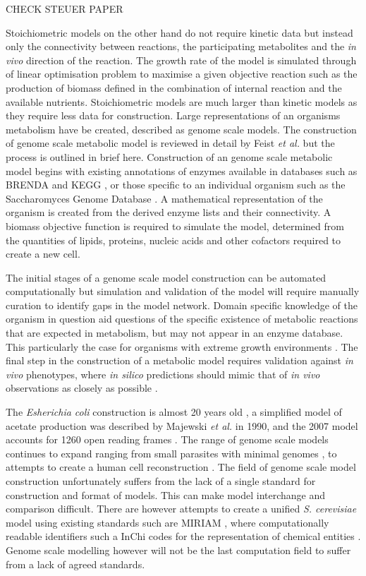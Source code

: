 CHECK STEUER PAPER

Stoichiometric models on the other hand do not require kinetic data but instead only the connectivity between reactions, the participating metabolites and the \emph{in vivo} direction of the reaction. The growth rate of the model is simulated through of linear optimisation problem to maximise a given objective reaction such as the production of biomass defined in the combination of internal reaction and the available nutrients. Stoichiometric models are much larger than kinetic models as they require less data for construction. Large representations of an organisms metabolism have be created, described as genome scale models. The construction of genome scale metabolic model is reviewed in detail by Feist \emph{et al.} \cite{feist2009} but the process is outlined in brief here. Construction of an genome scale metabolic model begins with existing annotations of enzymes available in databases such as BRENDA \cite{chang2009} and KEGG \cite{okuda2008}, or those specific to an individual organism such as the Saccharomyces Genome Database \cite{cherry1997}. A mathematical representation of the organism is created from the derived enzyme lists and their connectivity. A biomass objective function is required to simulate the model, determined from the quantities of lipids, proteins, nucleic acids and other cofactors required to create a new cell.

The initial stages of a genome scale model construction can be automated computationally but simulation and validation of the model will require manually curation to identify gaps in the model network. Domain specific knowledge of the organism in question aid questions of the specific existence of metabolic reactions that are expected in metabolism, but may not appear in an enzyme database. This particularly the case for organisms with extreme growth environments \cite{strauer_cyano}. The final step in the construction of a metabolic model requires validation against \emph{in vivo} phenotypes, where \emph{in silico} predictions should mimic that of \emph{in vivo} observations as closely as possible \cite{famili2003}.

The \emph{Esherichia coli} construction is almost 20 years old \cite{feist2008}, a simplified model of acetate production was described by Majewski \emph{et al.} in 1990, and the 2007 model accounts for 1260 open reading frames \cite{feist2007}. The range of genome scale models continues to expand ranging from small parasites with minimal genomes \cite{genitalium}, to attempts to create a human cell reconstruction \cite{human}. The field of genome scale model construction unfortunately suffers from the lack of a single standard for construction and format of models. This can make model interchange and comparison difficult. There are however attempts to create a unified \emph{S. cerevisiae} model \cite{herrgard} using existing standards such are MIRIAM \cite{miriam}, where computationally readable identifiers such a InChi codes for the representation of chemical entities \cite{inchi}. Genome scale modelling however will not be the last computation field to suffer from a lack of agreed standards.

